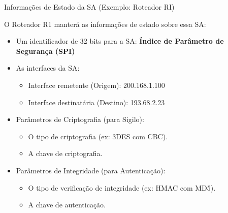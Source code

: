 \begin{frame}{Informações de Estado da SA (Exemplo: Roteador RI)}

    O Roteador R1 manterá as informações de estado sobre essa SA:

    \begin{itemize}
        \item Um identificador de 32 bits para a SA: \textbf{Índice de Parâmetro de Segurança (SPI)}


        \item As interfaces da SA:
              \begin{itemize}
                  \item Interface remetente (Origem): 200.168.1.100
                  \item Interface destinatária (Destino): 193.68.2.23
              \end{itemize}

        \item Parâmetros de Criptografia (para Sigilo):
              \begin{itemize}
                  \item O tipo de criptografia (ex: 3DES com CBC).
                  \item A chave de criptografia.
              \end{itemize}

        \item Parâmetros de Integridade (para Autenticação):
              \begin{itemize}
                  \item O tipo de verificação de integridade (ex: HMAC com MD5).
                  \item A chave de autenticação.
              \end{itemize}
    \end{itemize}
\end{frame}

